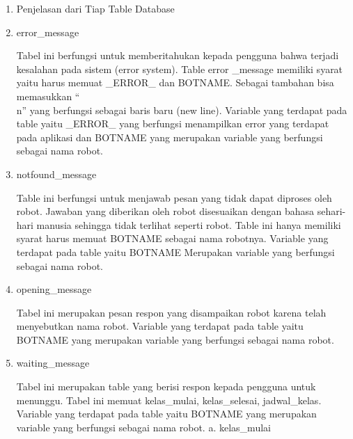 \documentclass{article}
\begin{document}
     \begin{enumerate}
    	\item Penjelasan dari Tiap Table Database
    		\newline
        \item error\_message
            \newline
            \par Tabel ini berfungsi untuk memberitahukan kepada pengguna bahwa terjadi kesalahan pada sistem (error system). Table error \_message memiliki syarat yaitu harus memuat \_ERROR\_ dan BOTNAME. Sebagai tambahan bisa memasukkan “\\n” yang berfungsi sebagai baris baru (new line). Variable yang terdapat pada table yaitu \_ERROR\_ yang berfungsi menampilkan error yang terdapat pada aplikasi dan BOTNAME yang merupakan variable yang berfungsi sebagai nama robot.
            \newline
        \item notfound\_message
            \newline
            \par Table ini berfungsi untuk menjawab pesan yang tidak dapat diproses oleh robot. Jawaban yang diberikan oleh robot disesuaikan dengan bahasa sehari-hari manusia sehingga tidak terlihat seperti robot. Table ini hanya memiliki syarat harus memuat BOTNAME sebagai nama robotnya. Variable yang terdapat pada table yaitu BOTNAME Merupakan variable yang berfungsi sebagai nama robot.
            \newline
        \item opening\_message
            \newline
            \par Tabel  ini merupakan pesan respon  yang disampaikan robot karena telah menyebutkan nama robot. Variable yang terdapat pada table yaitu BOTNAME yang merupakan variable yang berfungsi sebagai nama robot.
            \newline
        \item waiting\_message
            \newline
            \par Tabel ini merupakan table yang berisi respon kepada pengguna untuk menunggu. Tabel ini memuat kelas\_mulai, kelas\_selesai, jadwal\_kelas. Variable yang terdapat pada table yaitu BOTNAME yang merupakan variable yang berfungsi sebagai nama robot.
            \newline
        	a. kelas\_mulai
            \newline

\end{enumerate}
\end{document}
